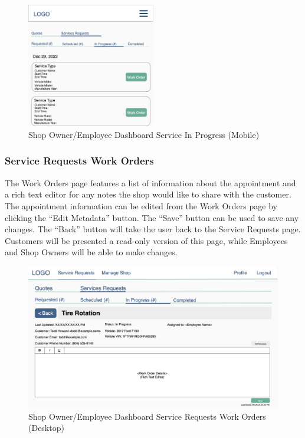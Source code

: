 \documentclass[12pt, titlepage]{article}
\begin{document}
\begin{figure}[H]
	\centering
	\includegraphics[width=0.5\textwidth]{mockups/Shop Owner Dashboard (Service Requests - In Progress) (Mobile).png}
	\caption{Shop Owner/Employee Dashboard \textemdash{} Service \textemdash{} In Progress (Mobile)}
\end{figure}

\subsubsection{Service Requests \textemdash{} Work Orders}

The Work Orders page features a list of information about the appointment and a rich text editor
for any notes the shop would like to share with the customer. The appointment information can be
edited from the Work Orders page by clicking the ``Edit Metadata'' button. The ``Save'' button can
be used to save any changes. The ``Back'' button will take the user back to the Service Requests
page. Customers will be presented a read-only version of this page, while Employees and Shop Owners
will be able to make changes.

\begin{figure}[H]
	\centering
	\includegraphics[width=\textwidth]{mockups/Shop Owner-Employee Work Order (Desktop).png}
	\caption{Shop Owner/Employee Dashboard \textemdash{} Service Requests \textemdash{} Work Orders (Desktop)}
\end{figure}
\end{document}
